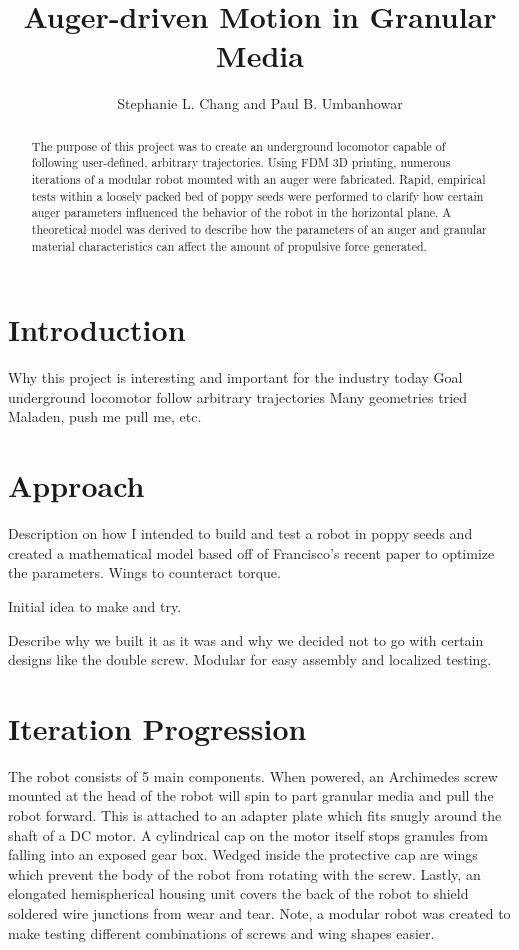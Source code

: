 \documentclass[letterpaper, 11 pt]{article}
\title{\Large \bf Auger-driven Motion in Granular Media}
\author{\centering Stephanie L. Chang and Paul B. Umbanhowar}
\begin{document}
\maketitle

\begin{abstract}
The purpose of this project was to create an underground locomotor capable of following user-defined, arbitrary trajectories. Using FDM 3D printing, numerous iterations of a modular robot mounted with an auger were fabricated. Rapid, empirical tests within a loosely packed bed of poppy seeds were performed to clarify how certain auger parameters influenced the behavior of the robot in the horizontal plane. A theoretical model was derived to describe how the parameters of an auger and granular material characteristics can affect the amount of propulsive force generated.   

\end{abstract}

\tableofcontents

\section{Introduction}

Why this project is interesting and important for the industry today
Goal underground locomotor follow arbitrary trajectories
Many geometries tried Maladen, push me pull me, etc. 

\section{Approach}
Description on how I intended to build and test a robot in poppy seeds and created a mathematical model based off of Francisco's recent paper to optimize the parameters.  
Wings to counteract torque.

Initial idea to make and try.

Describe why we built it as it was and why we decided not to go with certain designs like the double screw. Modular for easy assembly and localized testing. 

\section{Iteration Progression}

The robot consists of 5 main components. When powered, an Archimedes screw mounted at the head of the robot will spin to part granular media and pull the robot forward. This is attached to an adapter plate which fits snugly around the shaft of a DC motor. A cylindrical cap on the motor itself stops granules from falling into an exposed gear box. Wedged inside the protective cap are wings which prevent the body of the robot from rotating with the screw. Lastly, an elongated hemispherical housing unit covers the back of the robot to shield soldered wire junctions from wear and tear. Note, a modular robot was created to make testing different combinations of screws and wing shapes easier.
\end{document}
